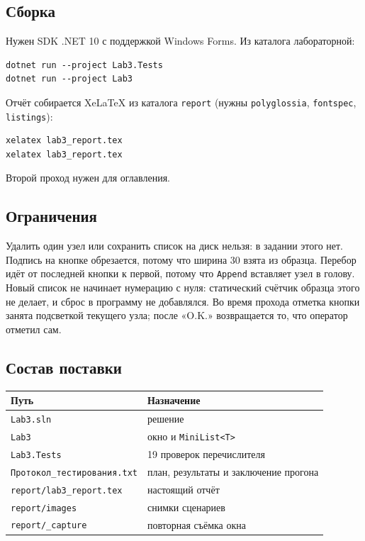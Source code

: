 \documentclass[a4paper,14pt]{extarticle}
\begin{document}
\subsection{Сборка}
Нужен SDK .NET 10 с поддержкой Windows Forms. Из каталога лабораторной:
\begin{lstlisting}[style=cmd]
dotnet run --project Lab3.Tests
dotnet run --project Lab3
\end{lstlisting}
Отчёт собирается XeLaTeX из каталога \texttt{report} (нужны \texttt{polyglossia}, \texttt{fontspec}, \texttt{listings}):
\begin{lstlisting}[style=cmd]
xelatex lab3_report.tex
xelatex lab3_report.tex
\end{lstlisting}
Второй проход нужен для оглавления.
\subsection{Ограничения}
Удалить один узел или сохранить список на диск нельзя: в задании этого нет. Подпись на кнопке обрезается, потому что ширина 30 взята из образца. Перебор идёт от последней кнопки к первой, потому что \texttt{Append} вставляет узел в голову. Новый список не начинает нумерацию с нуля: статический счётчик образца этого не делает, и сброс в программу не добавлялся. Во время прохода отметка кнопки занята подсветкой текущего узла; после «O.K.» возвращается то, что оператор отметил сам.
\subsection{Состав поставки}
\begin{center}
\begin{tabular}{p{}p{}}
\toprule
Путь & Назначение\\
\midrule
\texttt{Lab3.sln} & решение\\
\texttt{Lab3} & окно и \texttt{MiniList<T>}\\
\texttt{Lab3.Tests} & 19 проверок перечислителя\\
\texttt{Протокол\_тестирования.txt} & план, результаты и заключение прогона\\
\texttt{report/lab3\_report.tex} & настоящий отчёт\\
\texttt{report/images} & снимки сценариев\\
\texttt{report/\_capture} & повторная съёмка окна\\
\bottomrule
\end{tabular}
\end{center}
\end{document}
